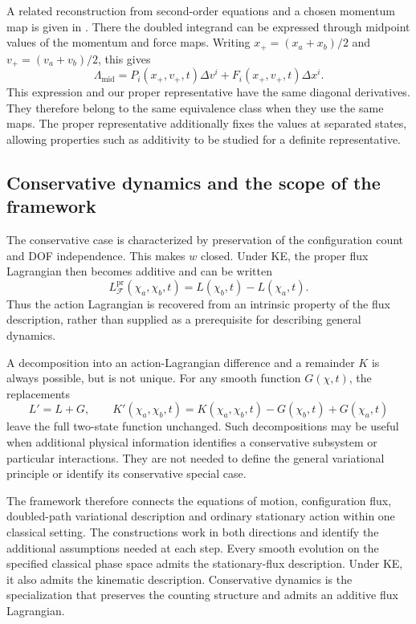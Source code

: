 \documentclass[12pt]{article}
\begin{document}
A related reconstruction from second-order equations and a chosen momentum map is given in \cite{aykroyd}. There the doubled integrand can be expressed through midpoint values of the momentum and force maps. Writing $x_+=(x_a+x_b)/2$ and $v_+=(v_a+v_b)/2$, this gives
\begin{equation}
	\Lambda_{\mathrm{mid}}
	=P_i(x_+,v_+,t)\Delta v^i
	+F_i(x_+,v_+,t)\Delta x^i.
\end{equation}
This expression and our proper representative have the same diagonal derivatives. They therefore belong to the same equivalence class when they use the same maps. The proper representative additionally fixes the values at separated states, allowing properties such as additivity to be studied for a definite representative.

\subsection{Conservative dynamics and the scope of the framework}

The conservative case is characterized by preservation of the configuration count and DOF independence. This makes $w$ closed. Under KE, the proper flux Lagrangian then becomes additive and can be written
\begin{equation}
	L_{\mathcal F}^{\mathrm{pr}}(\chi_a,\chi_b,t)
	=L(\chi_b,t)-L(\chi_a,t).
\end{equation}
Thus the action Lagrangian is recovered from an intrinsic property of the flux description, rather than supplied as a prerequisite for describing general dynamics.

A decomposition into an action-Lagrangian difference and a remainder $K$ is always possible, but is not unique. For any smooth function $G(\chi,t)$, the replacements
\begin{equation}
	L'=L+G,
	\qquad
	K'(\chi_a,\chi_b,t)
	=K(\chi_a,\chi_b,t)
	-G(\chi_b,t)+G(\chi_a,t)
\end{equation}
leave the full two-state function unchanged. Such decompositions may be useful when additional physical information identifies a conservative subsystem or particular interactions. They are not needed to define the general variational principle or identify its conservative special case.

The framework therefore connects the equations of motion, configuration flux, doubled-path variational description and ordinary stationary action within one classical setting. The constructions work in both directions and identify the additional assumptions needed at each step. Every smooth evolution on the specified classical phase space admits the stationary-flux description. Under KE, it also admits the kinematic description. Conservative dynamics is the specialization that preserves the counting structure and admits an additive flux Lagrangian.
\end{document}
